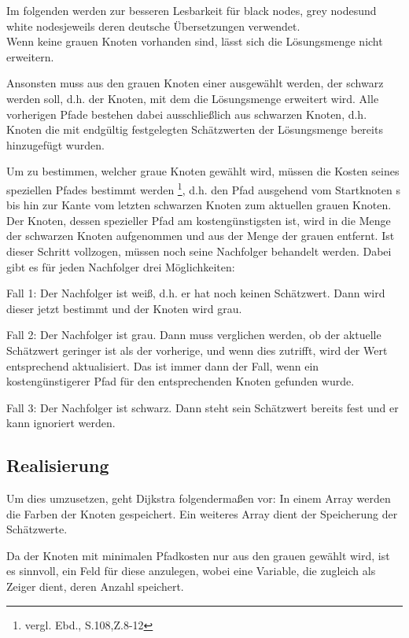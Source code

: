 \parindent0pt Im folgenden werden zur besseren Lesbarkeit für \glqq black nodes\grqq, \glqq grey nodes\grqq und \glqq white nodes\grqq jeweils deren deutsche Übersetzungen verwendet. \\
 Wenn keine grauen Knoten vorhanden sind, lässt sich die Lösungsmenge nicht erweitern. 

\parindent0pt Ansonsten muss aus den grauen Knoten einer ausgewählt werden, der schwarz werden soll, d.h. der Knoten, mit dem die Lösungsmenge erweitert wird. Alle vorherigen Pfade bestehen dabei ausschließlich aus schwarzen Knoten, d.h. Knoten die mit endgültig festgelegten Schätzwerten der Lösungsmenge bereits hinzugefügt wurden.

\parindent0pt Um zu bestimmen, welcher graue Knoten gewählt wird, müssen die Kosten seines speziellen Pfades bestimmt werden \footnote{vergl. Ebd., S.108,Z.8-12}, d.h. den Pfad ausgehend vom Startknoten s bis hin zur Kante vom letzten schwarzen Knoten zum aktuellen grauen Knoten. Der Knoten, dessen spezieller Pfad am kostengünstigsten ist, wird in die Menge der schwarzen Knoten aufgenommen und aus der Menge der grauen entfernt. Ist dieser Schritt vollzogen, müssen noch seine Nachfolger behandelt werden. Dabei gibt es für jeden Nachfolger drei Möglichkeiten:

\parindent0pt Fall 1: Der Nachfolger ist weiß, d.h. er hat noch keinen Schätzwert. Dann wird dieser jetzt bestimmt und der Knoten wird grau.

\parindent0pt Fall 2: Der Nachfolger ist grau. Dann muss verglichen werden, ob der aktuelle Schätzwert geringer ist als der vorherige, und wenn dies zutrifft, wird der Wert entsprechend aktualisiert. Das ist immer dann der Fall, wenn ein kostengünstigerer Pfad für den entsprechenden Knoten gefunden wurde.

\parindent0pt Fall 3: Der Nachfolger ist schwarz. Dann steht sein Schätzwert bereits fest und er kann ignoriert werden.

\subsection{Realisierung}
Um dies umzusetzen, geht Dijkstra folgendermaßen vor: In einem Array werden die Farben der Knoten gespeichert. Ein weiteres Array dient der Speicherung der Schätzwerte. 

\parindent0pt Da der Knoten mit minimalen Pfadkosten nur aus den grauen gewählt wird, ist es sinnvoll, ein Feld für diese anzulegen, wobei eine Variable, die zugleich als Zeiger dient, deren Anzahl speichert.

